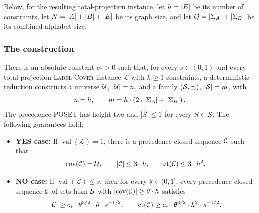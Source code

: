 Below, for the resulting total-projection instance, let $h=\mathopen{}\left| E \right|$ be its number of constraints, let $N=\mathopen{}\left| A \right|+\mathopen{}\left| B \right|+\mathopen{}\left| E \right|$ be its graph size, and let $Q=\mathopen{}\left| \Sigma_A \right|+\mathopen{}\left| \Sigma_B \right|$ be its combined alphabet size.

\subsubsection{The construction}

\begin{lemma}\label{lem:label-cover-covering-gap}
    There is an absolute constant $c_*>0$ such that, for every $s\in(0,1)$ and every total-projection \textup{\textsc{Label Cover}} instance $\mathcal L$ with $h\geq1$ constraints, a deterministic reduction constructs a universe $\mathcal{U}$, $\mathopen{}\left| \mathcal{U} \right|=n$, and a family $(\mathcal{S},\preceq)$, $\mathopen{}\left| \mathcal{S} \right|=m$, with
    \[
        n=h,\qquad m=h\cdot\mathopen{}\left( 2\cdot\mathopen{}\left| \Sigma_A \right|+\mathopen{}\left| \Sigma_B \right| \right).
    \]
    The precedence POSET has height two and $\mathopen{}\left| S \right|\leq1$ for every $S\in\mathcal{S}$. The following guarantees hold:
    \begin{itemize}
        \item \textbf{YES case:} If $\operatorname{val}(\mathcal L)=1$, there is a precedence-closed sequence $\mathcal{C}$ such that
        \[
            \operatorname{cov}\mathopen{}\left( \mathcal{C} \right)=\mathcal{U},\qquad
            \mathopen{}\left| \mathcal{C} \right|\leq3\cdot h,\qquad
            \operatorname{ct}\mathopen{}\left( \mathcal{C} \right)\leq3\cdot h^2.
        \]
        \item \textbf{NO case:} If $\operatorname{val}(\mathcal L)\leq s$, then for every $\theta\in(0,1]$, every precedence-closed sequence $\mathcal{C}$ of sets from $\mathcal{S}$ with $\mathopen{}\left| \operatorname{cov}\mathopen{}\left( \mathcal{C} \right) \right|\geq\theta\cdot h$ satisfies
        \[
            \mathopen{}\left| \mathcal{C} \right|\geq c_*\cdot\theta^{3/2}\cdot h\cdot s^{-1/2},
            \qquad
            \operatorname{ct}\mathopen{}\left( \mathcal{C} \right)\geq c_*\cdot\theta^{3/2}\cdot h^2\cdot s^{-1/2}.
        \]
    \end{itemize}
\end{lemma}
